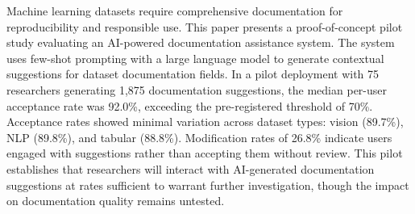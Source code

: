 
Machine learning datasets require comprehensive documentation for reproducibility and responsible use. This paper presents a proof-of-concept pilot study evaluating an AI-powered documentation assistance system. The system uses few-shot prompting with a large language model to generate contextual suggestions for dataset documentation fields. In a pilot deployment with 75 researchers generating 1,875 documentation suggestions, the median per-user acceptance rate was 92.0\%, exceeding the pre-registered threshold of 70\%. Acceptance rates showed minimal variation across dataset types: vision (89.7\%), NLP (89.8\%), and tabular (88.8\%). Modification rates of 26.8\% indicate users engaged with suggestions rather than accepting them without review. This pilot establishes that researchers will interact with AI-generated documentation suggestions at rates sufficient to warrant further investigation, though the impact on documentation quality remains untested.
